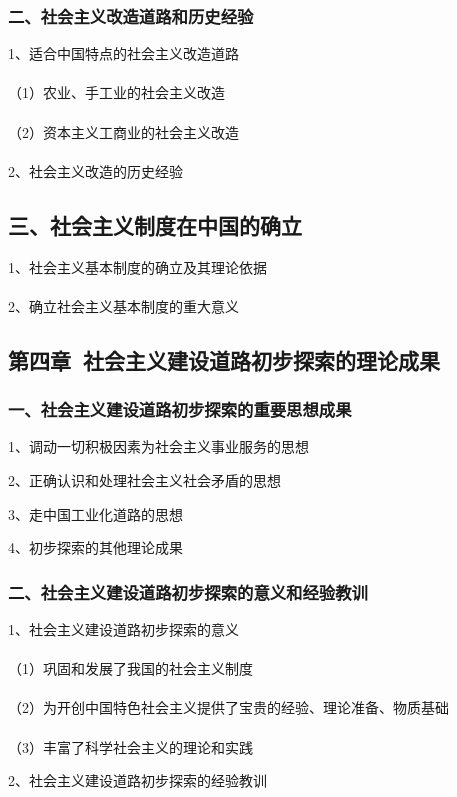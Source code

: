 \documentclass{ctexart}
\begin{document}
\subsubsection{二、社会主义改造道路和历史经验}
1、适合中国特点的社会主义改造道路
\\\\
（1）农业、手工业的社会主义改造
\\\\
（2）资本主义工商业的社会主义改造
\\\\

2、社会主义改造的历史经验

\subsection{三、社会主义制度在中国的确立}
1、社会主义基本制度的确立及其理论依据
\\\\

2、确立社会主义基本制度的重大意义

\subsection{第四章\ 社会主义建设道路初步探索的理论成果}
\subsubsection{一、社会主义建设道路初步探索的重要思想成果}
1、调动一切积极因素为社会主义事业服务的思想

2、正确认识和处理社会主义社会矛盾的思想

3、走中国工业化道路的思想

4、初步探索的其他理论成果

\subsubsection{二、社会主义建设道路初步探索的意义和经验教训}
1、社会主义建设道路初步探索的意义
\\\\
（1）巩固和发展了我国的社会主义制度
\\\\
（2）为开创中国特色社会主义提供了宝贵的经验、理论准备、物质基础
\\\\
（3）丰富了科学社会主义的理论和实践

2、社会主义建设道路初步探索的经验教训
\end{document}
